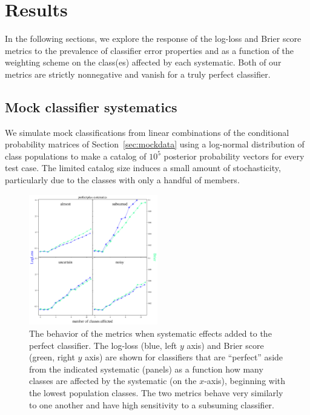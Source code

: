 \section{Results}
\label{sec:results}

In the following sections, we explore the response of the log-loss and Brier score metrics to the prevalence of classifier error properties and as a function of the weighting scheme on the class(es) affected by each systematic.
Both of our metrics are strictly nonnegative and vanish for a truly perfect classifier.

\subsection{Mock classifier systematics}
\label{sec:mockresults}

We simulate mock classifications from linear combinations of the conditional probability matrices of Section~\ref{sec:mockdata} using a log-normal distribution of class populations to make a catalog of $10^{5}$ posterior probability vectors for every test case.
The limited catalog size induces a small amount of stochasticity, particularly due to the classes with only a handful of members.

\begin{figure}
	\begin{center}
		\includegraphics[width=0.5\textwidth]{./fig/systematics_onlyperfect.png}
		\caption{The behavior of the metrics when systematic effects added to the perfect classifier.
		The log-loss (blue, left $y$ axis) and Brier score (green, right $y$ axis) are shown for classifiers that are ``perfect'' aside from the indicated systematic (panels) as a function how many classes are affected by the systematic (on the $x$-axis), beginning with the lowest population classes.
		The two metrics behave very similarly to one another and have high sensitivity to a subsuming classifier.}
	\end{center}
	\label{fig:cruise}
\end{figure}

